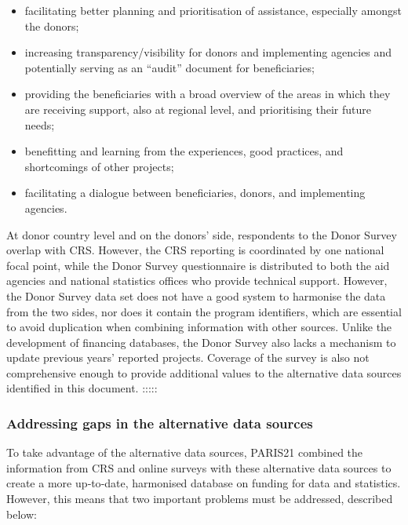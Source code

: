 \documentclass[
]{article}
\begin{document}
\begin{itemize}
\item
  facilitating better planning and prioritisation of assistance, especially amongst the donors;
\item
  increasing transparency/visibility for donors and implementing agencies and potentially serving as an ``audit'' document for beneficiaries;
\item
  providing the beneficiaries with a broad overview of the areas in which they are receiving support, also at regional level, and prioritising their future needs;
\item
  benefitting and learning from the experiences, good practices, and shortcomings of other projects;
\item
  facilitating a dialogue between beneficiaries, donors, and implementing agencies.
\end{itemize}

At donor country level and on the donors' side, respondents to the Donor Survey overlap with
CRS. However, the CRS reporting is coordinated by one national focal point, while the Donor
Survey questionnaire is distributed to both the aid agencies and national statistics offices who
provide technical support. However, the Donor Survey data set does not have a good system to
harmonise the data from the two sides, nor does it contain the program identifiers, which
are essential to avoid duplication when combining information with other sources. Unlike the
development of financing databases, the Donor Survey also lacks a mechanism to update
previous years' reported projects. Coverage of the survey is also not comprehensive enough to
provide additional values to the alternative data sources identified in this document.
:::::

\hypertarget{addressing-gaps-in-the-alternative-data-sources}{%
\subsubsection{Addressing gaps in the alternative data sources}\label{addressing-gaps-in-the-alternative-data-sources}}

To take advantage of the alternative data sources, PARIS21 combined the information from CRS and
online surveys with these alternative data sources to create a more up‐to‐date, harmonised database
on funding for data and statistics. However, this means that two important problems must be
addressed, described below:
\end{document}
